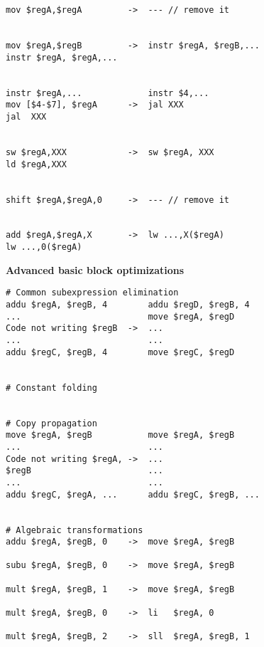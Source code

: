 \documentclass[10pt,a4paper]{article}
\begin{document}
\begin{verbatim}
mov $regA,$regA         ->  --- // remove it


mov $regA,$regB         ->  instr $regA, $regB,...
instr $regA, $regA,...


instr $regA,...             instr $4,...
mov [$4-$7], $regA      ->  jal XXX
jal  XXX


sw $regA,XXX            ->  sw $regA, XXX
ld $regA,XXX


shift $regA,$regA,0     ->  --- // remove it


add $regA,$regA,X       ->  lw ...,X($regA)
lw ...,0($regA)
\end{verbatim}
\textbf{Advanced basic block optimizations}

\begin{verbatim}
# Common subexpression elimination
addu $regA, $regB, 4        addu $regD, $regB, 4
...                         move $regA, $regD
Code not writing $regB  ->  ...
...                         ...
addu $regC, $regB, 4        move $regC, $regD


# Constant folding


# Copy propagation
move $regA, $regB           move $regA, $regB
...                         ...
Code not writing $regA, ->  ...
$regB                       ...
...                         ...
addu $regC, $regA, ...      addu $regC, $regB, ...


# Algebraic transformations
addu $regA, $regB, 0    ->  move $regA, $regB

subu $regA, $regB, 0    ->  move $regA, $regB

mult $regA, $regB, 1    ->  move $regA, $regB

mult $regA, $regB, 0    ->  li   $regA, 0

mult $regA, $regB, 2    ->  sll  $regA, $regB, 1
\end{verbatim}
\end{document}
